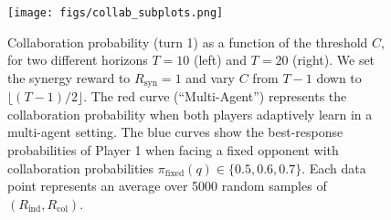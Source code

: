 \begin{figure}[htbp]
  \centering
  \texttt{[image: figs/collab\_subplots.png]}
    \safevspace{-5mm}
  \caption{
Collaboration probability (turn 1) as a function of the threshold \(C\), for two different horizons \(T=10\) (left) and \(T=20\) (right). 
We set the synergy reward to \(R_{\mathrm{syn}}=1\) and vary \(C\) from \(T{-}1\) down to \(\lfloor (T{-}1)/2 \rfloor\).  
The red curve (``Multi-Agent'') represents the collaboration probability when both players adaptively learn in a multi-agent setting.  
The blue curves show the best-response probabilities of Player 1 when facing a fixed opponent with collaboration probabilities \(\pi_{\mathrm{fixed}}(q) \in \{0.5,0.6,0.7\}\).  
Each data point represents an average over 5000 random samples of \((R_{\mathrm{ind}}, R_{\mathrm{col}})\). }
  \safevspace{-5mm}
  \label{figs:collaboration_probability}
\end{figure}


